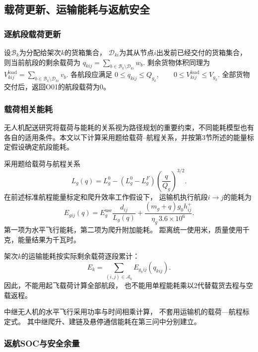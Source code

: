 \documentclass[bwprint]{gmcmthesis}
\begin{document}
\subsection{载荷更新、运输能耗与返航安全}

\subsubsection{逐航段载荷更新}

设$\mathcal{B}_k$为分配给架次$k$的货箱集合，
$\mathcal{D}_{ki}$为其从节点$i$出发前已经交付的货箱集合，
则当前航段的剩余载荷为
\(q_{kij} = \sum_{b\in\mathcal{B}_k\setminus\mathcal{D}_{ki}}w_b\).
剩余货物体积同理为
\(V_{kij}^{\mathrm{load}} = \sum_{b\in\mathcal{B}_k\setminus\mathcal{D}_{ki}}v_b\).
各航段应满足
\(0\leq q_{kij}\leq Q_{g_k}, \qquad 0\leq V_{kij}^{\mathrm{load}}\leq V_{g_k}\).
全部货物交付后，返回O01的航段载荷为0。

\subsubsection{载荷相关能耗}
无人机配送研究将载荷与能耗的关系视为路径规划的重要约束，不同能耗模型也有各自的适用条件\cite{dorling2017,zhang2021}。本文以下计算采用题给载荷--航程关系，并按第3节所述的能量标定假设确定航段能耗。


采用题给载荷与航程关系
\begin{equation}
    L_g(q)
    =
    L_g^0-
    (L_g^0-L_g^F)
    \left(\frac{q}{Q_g}\right)^{3/2}.
\end{equation}
在前述标准航程能量标定和爬升效率工作假设下，
运输机执行航段$i\to j$的能耗为
\begin{equation}
    E_{gij}(q)
    =
    E_g^{\mathrm{use}}
    \frac{d_{ij}}{L_g(q)}
    +
    \frac{(m_g+q)g_0h_{ij}^{+}}
    {\eta_g\,3.6\times10^{6}}.
\end{equation}
第一项为水平飞行能耗，第二项为爬升附加能耗。
距离统一使用米，质量使用千克，能量结果为千瓦时。

架次$k$的运输能耗按实际剩余载荷逐段累计：
\begin{equation}
    E_k
    =
    \sum_{(i,j)\in\mathcal{A}_k}
    E_{g_kij}(q_{kij}).
\end{equation}
因此，不能用起飞载荷计算全部航段，
也不能用单程能耗乘以2代替载货去程与空载返程。

中继无人机的水平飞行采用功率与时间相乘计算，
不套用运输机的载荷—航程标定式。
其中继爬升、建链及悬停通信能耗在第三问中分别建立。

\subsubsection{返航SOC与安全余量}
\end{document}
